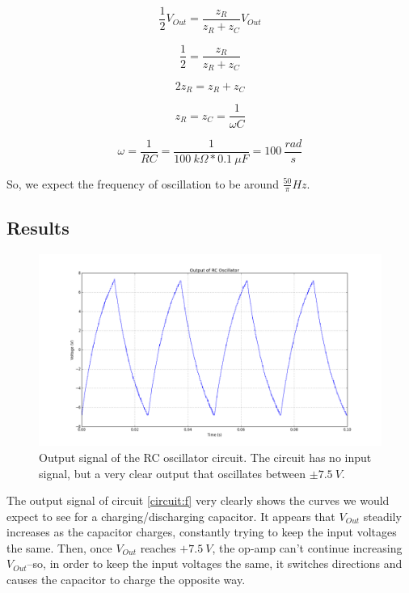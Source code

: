 \documentclass[11pt]{article}
\begin{document}
\begin{equation}
    \frac{1}{2} V_{Out} = \frac{z_R}{z_R + z_C} V_{Out}
\end{equation}

\begin{equation}
    \frac{1}{2} = \frac{z_R}{z_R + z_C}
\end{equation}

\begin{equation}
    2 z_R = z_R + z_C
\end{equation}

\begin{equation}
    z_R = z_C = \frac{1}{\omega C}
\end{equation}

\begin{equation}
    \omega = \frac{1}{RC} = \frac{1}{100\ k \Omega * 0.1\ \mu F} = 100\ \frac{rad}{s}
\end{equation}

So, we expect the frequency of oscillation to be around $\frac{50}{\pi} Hz$.\\


\subsection{Results}

\begin{figure}[H]
    \centering
    \includegraphics[scale=0.4]{Plots/figF.png}
    \caption{Output signal of the RC oscillator circuit. The circuit has no input signal, but a very clear output that oscillates between $\pm 7.5\ V$.}
    \label{fig:F}
\end{figure}

The output signal of circuit \ref{circuit:f} very clearly shows the curves we would expect to see for a charging/discharging capacitor. It appears that $V_{Out}$ steadily increases as the capacitor charges, constantly trying to keep the input voltages the same. Then, once $V_{Out}$ reaches $+7.5\ V$, the op-amp can't continue increasing $V_{Out}$--so, in order to keep the input voltages the same, it switches directions and causes the capacitor to charge the opposite way. \\
\end{document}
